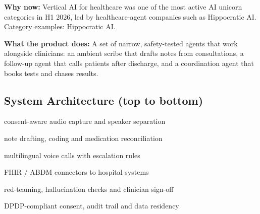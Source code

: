 \documentclass[10pt,a4paper]{article}
\begin{document}
\begin{tcolorbox}[colback=l1bg,colframe=l1bg,arc=2pt,borderline west={3pt}{0pt}{saffron},top=2pt,bottom=2pt]\small\textbf{Why now:} Vertical AI for healthcare was one of the most active AI unicorn categories in H1 2026, led by healthcare-agent companies such as Hippocratic AI. {\color{muted}Category examples: Hippocratic AI.}\end{tcolorbox}
\begin{tcolorbox}[colback=l3bg,colframe=l3bg,arc=2pt,borderline west={3pt}{0pt}{igreen},top=2pt,bottom=2pt]\small\textbf{What the product does:} A set of narrow, safety-tested agents that work alongside clinicians: an ambient scribe that drafts notes from consultations, a follow-up agent that calls patients after discharge, and a coordination agent that books tests and chases results.\end{tcolorbox}
\subsection*{System Architecture (top to bottom)}
\begin{tcolorbox}[colback=lay0,colframe=lay0,arc=2pt,top=1.5pt,bottom=1.5pt,left=6pt,before skip=2pt,after skip=2pt]\small{} consent-aware audio capture and speaker separation\end{tcolorbox}
\begin{tcolorbox}[colback=lay1,colframe=lay1,arc=2pt,top=1.5pt,bottom=1.5pt,left=6pt,before skip=2pt,after skip=2pt]\small{} note drafting, coding and medication reconciliation\end{tcolorbox}
\begin{tcolorbox}[colback=lay2,colframe=lay2,arc=2pt,top=1.5pt,bottom=1.5pt,left=6pt,before skip=2pt,after skip=2pt]\small{} multilingual voice calls with escalation rules\end{tcolorbox}
\begin{tcolorbox}[colback=lay3,colframe=lay3,arc=2pt,top=1.5pt,bottom=1.5pt,left=6pt,before skip=2pt,after skip=2pt]\small{} FHIR / ABDM connectors to hospital systems\end{tcolorbox}
\begin{tcolorbox}[colback=lay4,colframe=lay4,arc=2pt,top=1.5pt,bottom=1.5pt,left=6pt,before skip=2pt,after skip=2pt]\small{} red-teaming, hallucination checks and clinician sign-off\end{tcolorbox}
\begin{tcolorbox}[colback=lay5,colframe=lay5,arc=2pt,top=1.5pt,bottom=1.5pt,left=6pt,before skip=2pt,after skip=2pt]\small{} DPDP-compliant consent, audit trail and data residency\end{tcolorbox}
\end{document}
